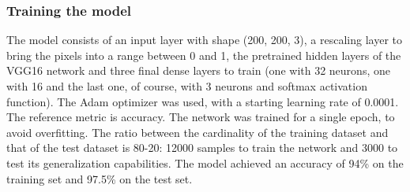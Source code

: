 \documentclass[a4paper,11pt]{report}
\theoremstyle{definition}
\theoremstyle{plain}
\begin{document}
            \subsubsection{Training the model}
                The model consists of an input layer with shape (200, 200, 3), a rescaling layer to bring the pixels into a range between 0 and 1, the pretrained hidden layers of the VGG16 network and three final dense layers to train (one with 32 neurons, one with 16 and the last one, of course, with 3 neurons and softmax activation function). The Adam optimizer was used, with a starting learning rate of 0.0001. The reference metric is accuracy.
                The network was trained for a single epoch, to avoid overfitting. The ratio between the cardinality of the training dataset and that of the test dataset is 80-20: 12000 samples to train the network and 3000 to test its generalization capabilities. The model achieved an accuracy of 94\% on the training set and 97.5\% on the test set.
\end{document}
